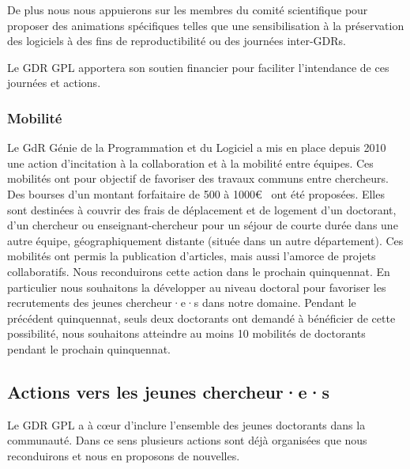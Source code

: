 \documentclass[11pt]{article}
\begin{document}
De plus nous nous appuierons sur les membres du comité scientifique pour proposer des animations spécifiques telles que une sensibilisation à la préservation des logiciels à des fins de reproductibilité ou des journées inter-GDRs. 

Le GDR GPL apportera son soutien financier pour faciliter l'intendance de ces journées et actions.



\subsubsection{Mobilité}
Le GdR Génie de la Programmation et du Logiciel a mis en place depuis 2010 une action d'incitation à la collaboration et à la mobilité entre équipes. Ces mobilités ont pour objectif de favoriser des travaux communs
entre chercheurs. Des bourses d'un montant forfaitaire de 500 à 1000\euro~ ont été proposées. Elles sont destinées à couvrir des frais de déplacement et de logement d'un doctorant, d'un chercheur ou enseignant-chercheur pour un séjour de courte durée dans une autre équipe, géographiquement distante (située dans un autre département). Ces mobilités ont permis la publication d'articles, mais aussi l'amorce de projets collaboratifs. Nous reconduirons cette action dans le prochain quinquennat. En particulier nous souhaitons la développer au niveau doctoral pour favoriser les recrutements des jeunes chercheur·e·s dans notre domaine. Pendant le précédent quinquennat, seuls deux doctorants ont demandé à bénéficier de cette possibilité, nous souhaitons atteindre au moins 10 mobilités de doctorants pendant le prochain quinquennat.

\subsection{Actions vers les jeunes chercheur·e·s}

Le GDR GPL a à c{\oe}ur d'inclure l'ensemble des jeunes doctorants dans la
communauté. Dans ce sens plusieurs actions sont déjà organisées que nous reconduirons et nous en proposons de nouvelles.
\end{document}
